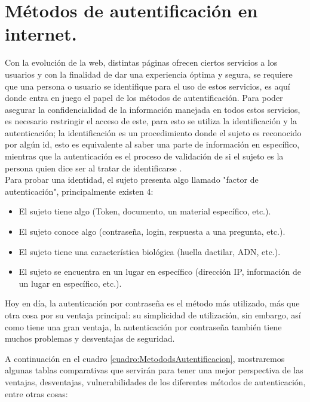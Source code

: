 \documentclass[12pt, a4paper, titlepage]{report}
\begin{document}
        
	    \section{Métodos de autentificación en internet.}
	    Con la evolución de la web, distintas páginas ofrecen ciertos servicios a los usuarios y con la finalidad de dar una experiencia óptima y segura, se requiere que una persona o usuario se identifique para el uso de estos servicios, es aquí donde entra en juego el papel de los métodos de autentificación. Para poder asegurar la confidencialidad de la información manejada en todos estos servicios, es necesario restringir el acceso de este, para esto se utiliza la identificación y la autenticación; la identificación es un procedimiento donde el sujeto es reconocido por algún \acrshort{id}, esto es equivalente al saber una parte de información en específico, mientras que la autenticación es el proceso de validación de si el sujeto es la persona quien dice ser al tratar de identificarse \cite{ComparisonAuthenticationMethodsResources}.\\
	    
	    Para probar una identidad, el sujeto presenta algo llamado "factor de autenticación", principalmente existen 4: 
	    \begin{itemize}
	        \item El sujeto tiene algo (Token, documento, un material específico, etc.).
	        \item El sujeto conoce algo (contraseña, login, respuesta a una pregunta, etc.).
	        \item El sujeto tiene una característica biológica (huella dactilar, ADN, etc.).
	        \item El sujeto se encuentra en un lugar en específico (dirección IP, información de un lugar en específico, etc.).
	    \end{itemize}
	    Hoy en  día, la autenticación por contraseña es el método más utilizado, más que otra cosa por su ventaja principal: su simplicidad de utilización, sin embargo, así como tiene una gran ventaja, la autenticación por contraseña también tiene muchos problemas y desventajas de seguridad.
	    
	    A continuación en el cuadro \ref{cuadro:MetododsAutentificacion}, mostraremos algunas tablas comparativas que servirán para tener una mejor perspectiva de las ventajas, desventajas, vulnerabilidades de los diferentes métodos de autenticación, entre otras cosas:
		
\end{document}
